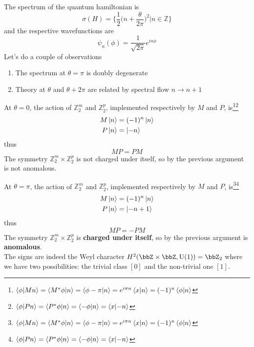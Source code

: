  The spectrum of the quantum hamiltonian is
    \begin{equation}
     \sigma(H) = \bigg\{ \frac{1}{2} \bigg(n + \frac{\theta}{2 \pi}\bigg)^2 \bigg| n \in \mathbb{Z}\bigg\}
 \end{equation}
 and the respective wavefunctions are
\begin{equation}
    \psi_n(\phi) = \frac{1}{\sqrt{2\pi}} e^{i n \phi}
\end{equation}
Let's do a couple of observations
\begin{enumerate}
    \item The spectrum at $\theta = \pi$ is doubly degenerate
    \item Theory at $\theta$ and $\theta + 2\pi$ are related by spectral flow $n \to n+1$
\end{enumerate}
At $\theta=0$, the action of $\mathbb{Z}_2^m$ and $\mathbb{Z}_2^p$, implemented respectively by $M$ and $P$, is\footnote{$\braket{\phi}{M n} = \braket{M^* \phi}{n} = \braket{\phi - \pi}{n} = e^{i \pi n}\braket{x}{n} = (-1)^n \braket{\phi}{n}$}\footnote{$\braket{\phi}{P n} = \braket{P^* \phi}{n} = \braket{-\phi}{n} =  \braket{x}{-n}$}
\begin{equation}
    \begin{aligned}
        M \ket{n} &= (-1)^n \ket{n}\\
        P \ket{n} &= \ket{-n}
    \end{aligned}
\end{equation}
thus
\begin{equation}
      MP = PM
\end{equation}  
The symmetry $\mathbb{Z}_2^m \times \mathbb{Z}_2^p$ is not charged under itself, so by the previous argument is not anomalous.
 
At $\theta=\pi$, the action of $\mathbb{Z}_2^m$ and $\mathbb{Z}_2^p$, implemented respectively by $M$ and $P$, is\footnote{$\braket{\phi}{M n} = \braket{M^* \phi}{n} = \braket{\phi - \pi}{n} = e^{i \pi n}\braket{x}{n} = (-1)^n \braket{\phi}{n}$}\footnote{$\braket{\phi}{P n} = \braket{P^* \phi}{n} = \braket{-\phi}{n} =  \braket{x}{-n}$}
\begin{equation}
    \begin{aligned}
        M \ket{n} &= (-1)^n \ket{n}\\
        P \ket{n} &= \ket{-n+1}
    \end{aligned}
\end{equation}
thus
\begin{equation}
      MP = - PM
\end{equation}  
The symmetry $\mathbb{Z}_2^m \times \mathbb{Z}_2^p$ is \textbf{charged under itself}, so by the previous argument is \textbf{anomalous}.\\
The signs are indeed the Weyl character $H^{2}(\bbZ\times\bbZ,\U(1))=\bbZ_{2}$ where we have two possibilities: the trivial class $[0]$ and the non-trivial one $[1]$.


